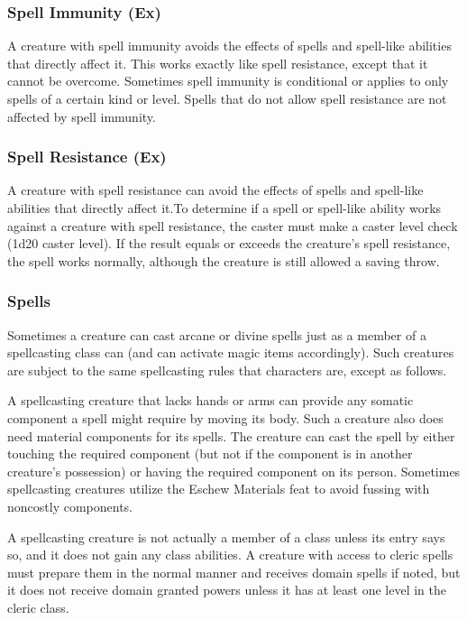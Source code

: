 \subsubsection{Spell Immunity (Ex)} A creature with spell immunity avoids the effects of spells and spell-like abilities that directly affect it. This works exactly like spell resistance, except that it cannot be overcome. Sometimes spell immunity is conditional or applies to only spells of a certain kind or level. Spells that do not allow spell resistance are not affected by spell immunity.

\subsubsection{Spell Resistance (Ex)} A creature with spell resistance can avoid the effects of spells and spell-like abilities that directly affect it.To determine if a spell or spell-like ability works against a creature with spell resistance, the caster must make a caster level check (1d20 \add caster level). If the result equals or exceeds the creature's spell resistance, the spell works normally, although the creature is still allowed a saving throw.

\subsubsection{Spells} Sometimes a creature can cast arcane or divine spells just as a member of a spellcasting class can (and can activate magic items accordingly). Such creatures are subject to the same spellcasting rules that characters are, except as follows. 

A spellcasting creature that lacks hands or arms can provide any somatic component a spell might require by moving its body. Such a creature also does need material components for its spells. The creature can cast the spell by either touching the required component (but not if the component is in another creature's possession) or having the required component on its person. Sometimes spellcasting creatures utilize the Eschew Materials feat to avoid fussing with noncostly components.

A spellcasting creature is not actually a member of a class unless its entry says so, and it does not gain any class abilities. A creature with access to cleric spells must prepare them in the normal manner and receives domain spells if noted, but it does not receive domain granted powers unless it has at least one level in the cleric class.

